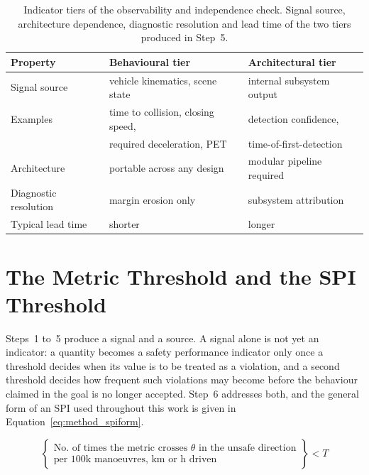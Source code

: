\begin{table}[htbp]
    \centering
    \caption[Indicator tiers of the observability and independence check]{Indicator tiers of the observability and independence check. Signal source, architecture dependence, diagnostic resolution and lead time of the two tiers produced in Step~5.}
    \label{tab:tiers}
    \begin{tabular}{@{}lll@{}}
        \toprule
        \textbf{Property} & \textbf{Behavioural tier} & \textbf{Architectural tier} \\
        \midrule
        Signal source     & vehicle kinematics, scene state & internal subsystem output \\
        Examples          & time to collision, closing speed, & detection confidence, \\
                          & required deceleration, PET & time-of-first-detection \\
        Architecture      & portable across any design & modular pipeline required \\
        Diagnostic resolution & margin erosion only & subsystem attribution \\
        Typical lead time & shorter & longer \\
        \bottomrule
    \end{tabular}
\end{table}

\section{The Metric Threshold and the SPI Threshold}
\label{sec:method_thresholds}

Steps~1 to~5 produce a signal and a source. A signal alone is not yet an
indicator: a quantity becomes a safety performance indicator only once a
threshold decides when its value is to be treated as a violation, and a second
threshold decides how frequent such violations may become before the behaviour
claimed in the goal is no longer accepted. Step~6 addresses both, and the general form of an
SPI used throughout this work is given in Equation~\eqref{eq:method_spiform}.

\begin{equation}
    \left\{
        \begin{array}{c}
            \text{No. of times the metric crosses } \theta
            \text{ in the unsafe direction} \\
            \text{per 100k manoeuvres, km or h driven}
        \end{array}
    \right\} < T
    \label{eq:method_spiform}
\end{equation}

